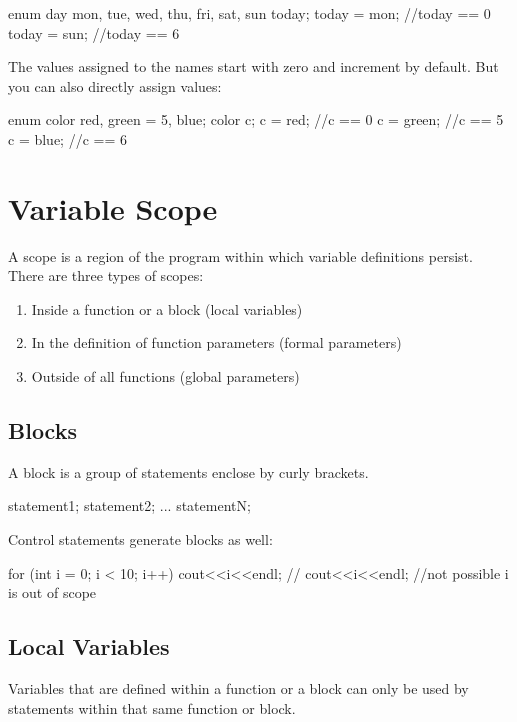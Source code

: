 \documentclass[10pt,a4paper]{scrartcl}
\begin{document}
\begin{multicols*}{2}
\begin{TPCpp}
enum day {mon, tue, wed, thu, fri, sat, sun} today;
today = mon; //today == 0
today = sun; //today == 6
\end{TPCpp}

The values assigned to the names start with zero and increment by default. But you can also directly assign values:

\begin{TPCpp}
enum color {red, green = 5, blue};
color c;
c = red;    //c == 0
c = green;  //c == 5
c = blue;   //c == 6
\end{TPCpp}
\fi

\section{Variable Scope}
\label{sec:VariableScope}

A scope is a region of the program within which variable definitions persist. There are three types of scopes:

\begin{enumerate}
\item Inside a function or a block (local variables)
\item In the definition of function parameters (formal parameters)
\item Outside of all functions (global parameters)
\end{enumerate}

\subsection{Blocks}
\label{sec:Blocks}

A block is a group of statements enclose by curly brackets.

\begin{TPCpp}
{statement1; statement2; ... statementN;}
\end{TPCpp}

Control statements generate blocks as well:

\begin{TPCpp}
for (int i = 0; i < 10; i++){
	cout<<i<<endl;
}
// cout<<i<<endl; //not possible i is out of scope
\end{TPCpp}

\subsection{Local Variables}
\label{sec:LocalVariables}

Variables that are defined within a function or a block can only be used by statements within that same function or block.


\end{multicols*}
\end{document}
